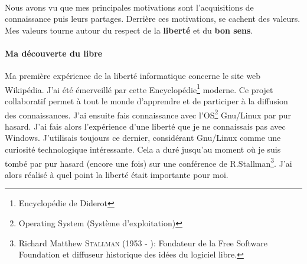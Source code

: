 \documentclass[a4paper,12pt, draft]{report}
\begin{document}
\paragraph{}
Nous avons vu que mes principales motivations sont l'acquisitions de connaissance puis leurs partages. Derrière ces motivations, se cachent des valeurs.
Mes valeurs tourne autour du respect de la \textbf{liberté} et du \textbf{bon sens}.



\paragraph{Ma découverte du libre}

Ma première expérience de la liberté informatique concerne le site web Wikipédia. J'ai été émerveillé par cette Encyclopédie\footnote{Encyclopédie de Diderot} moderne.
Ce projet collaboratif permet à tout le monde d'apprendre et de participer à la diffusion des connaissances.
J'ai ensuite fais connaissance avec l'OS\footnote{Operating System (Système d'exploitation)} Gnu/Linux par pur hasard. J'ai fais alors l'expérience d'une liberté que je ne connaissais pas avec Windows. J'utilisais toujours ce dernier, considérant Gnu/Linux comme une curiosité technologique intéressante. 
Cela a duré jusqu'au moment où je suis tombé par pur hasard (encore une fois) sur une conférence de R.Stallman\footnote{Richard Matthew \textsc{Stallman} (1953 - ): Fondateur de la Free Software Foundation et diffuseur historique des idées du logiciel libre.}. J'ai alors réalisé à quel point la liberté était importante pour moi.
\end{document}
